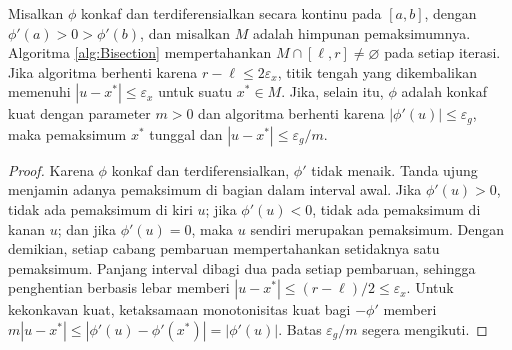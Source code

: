 \begin{algorithm}
\caption{Pencarian Biseksi}
\label{alg:Bisection}
\noindent{}
\end{algorithm}

\begin{theorem} Misalkan $\phi$ konkaf dan terdiferensialkan secara kontinu pada $[a,b]$, dengan $\phi'(a)>0>\phi'(b)$, dan misalkan $M$ adalah himpunan pemaksimumnya. Algoritma \ref{alg:Bisection} mempertahankan $M\cap[\ell,r]\neq\varnothing$ pada setiap iterasi. Jika algoritma berhenti karena $r-\ell\leq2\varepsilon_x$, titik tengah yang dikembalikan memenuhi $|u-x^*|\leq\varepsilon_x$ untuk suatu $x^*\in M$. Jika, selain itu, $\phi$ adalah konkaf kuat dengan parameter $m>0$ dan algoritma berhenti karena $|\phi'(u)|\leq\varepsilon_g$, maka pemaksimum $x^*$ tunggal dan $|u-x^*|\leq\varepsilon_g/m$.
\end{theorem}
\begin{proof} Karena $\phi$ konkaf dan terdiferensialkan, $\phi'$ tidak menaik. Tanda ujung menjamin adanya pemaksimum di bagian dalam interval awal. Jika $\phi'(u)>0$, tidak ada pemaksimum di kiri $u$; jika $\phi'(u)<0$, tidak ada pemaksimum di kanan $u$; dan jika $\phi'(u)=0$, maka $u$ sendiri merupakan pemaksimum. Dengan demikian, setiap cabang pembaruan mempertahankan setidaknya satu pemaksimum. Panjang interval dibagi dua pada setiap pembaruan, sehingga penghentian berbasis lebar memberi $|u-x^*|\leq(r-\ell)/2\leq\varepsilon_x$. Untuk kekonkavan kuat, ketaksamaan monotonisitas kuat bagi $-\phi'$ memberi $m|u-x^*|\leq|\phi'(u)-\phi'(x^*)|=|\phi'(u)|$. Batas $\varepsilon_g/m$ segera mengikuti.
\end{proof}

